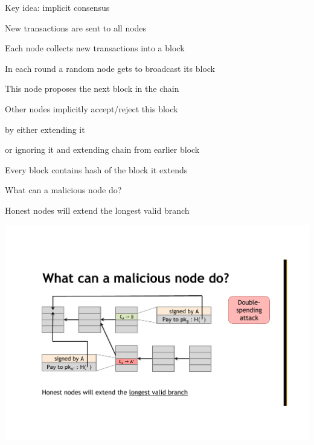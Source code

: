 \begin{frame}{Key idea: implicit consensus}
\BIL
\item New transactions are sent to all nodes
\item Each node collects new transactions into a block
\item In each round a random node gets to broadcast its block
\item This node proposes the next block in the chain
\item Other nodes implicitly accept/reject this block
	\BI
	\item by either extending it 
	\item or ignoring it and extending chain from earlier block
	\EI
\item Every block contains hash of the block it extends
\EI


\end{frame}


\begin{frame}{What can a malicious node do?}

Honest nodes will extend the longest valid branch

\begin{center}
\includegraphics[width=\textwidth]{double1}
\end{center}


\end{frame}

